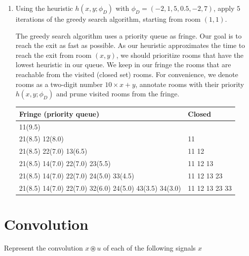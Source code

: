 \documentclass[11pt, a4paper]{article}
\begin{document}
\begin{enumerate}
    \item Using the heuristic $h(x, y; \phi_D)$ with $\phi_D = (-2, 1, 5, 0.5, -2, 7)$, apply $5$ iterations of the greedy search algorithm, starting from room $(1, 1)$.

    \begin{solution}
        The greedy search algorithm uses a priority queue as fringe. Our goal is to reach the exit as fast as possible. As our heuristic approximates the time to reach the exit from room $(x, y)$, we should prioritize rooms that have the lowest heuristic in our queue. We keep in our fringe the rooms that are reachable from the visited (closed set) rooms. For convenience, we denote rooms as a two-digit number $10 \times x + y$, annotate rooms with their priority $h(x, y; \phi_D)$ and prune visited rooms from the fringe.

        \begin{table}[H]
            \centering
            \begin{tabular}{l|l}
                \toprule
                Fringe (priority queue) & Closed \\
                \midrule
                11(9.5) & \\
                21(8.5) 12(8.0) & 11 \\
                21(8.5) 22(7.0) 13(6.5) & 11 12 \\
                21(8.5) 14(7.0) 22(7.0) 23(5.5) & 11 12 13\\
                21(8.5) 14(7.0) 22(7.0) 24(5.0) 33(4.5) & 11 12 13 23 \\
                21(8.5) 14(7.0) 22(7.0) 32(6.0) 24(5.0) 43(3.5) 34(3.0) & 11 12 13 23 33 \\
                \bottomrule
            \end{tabular}
        \end{table}
    \end{solution}
\end{enumerate}

\newpage

\section{Convolution}

Represent the convolution $x \circledast u$ of each of the following signals $x$

\newcommand{\signal}[1]{%
\begin{tikzpicture}
    \begin{axis}[%
        width=8cm,
        height=4cm,
        axis x line=middle,
        axis y line=none,
        domain=0:19,
        samples=20,
        xmin=-1,
        xmax=20,
        ymin=-1,
        ymax=+1,
        xmajorticks=false,
        ymajorticks=false,
    ]
        \addplot+[ycomb,black,thick,mark options={fill=white}] {#1};
    \end{axis}
\end{tikzpicture}
}
\end{document}
